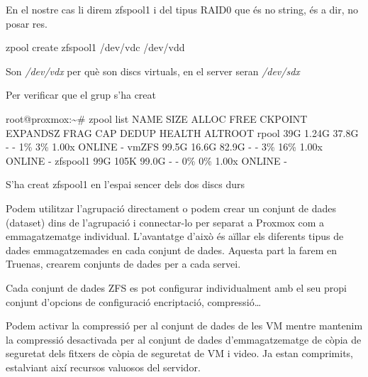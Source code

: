 \documentclass[
  10pt,
]{krantz}
\newenvironment{Shaded}{\begin{snugshade}}{\end{snugshade}}
\newcommand{\AttributeTok}[1]{\textcolor[rgb]{0.77,0.63,0.00}{#1}}
\newcommand{\ExtensionTok}[1]{#1}
\newcommand{\NormalTok}[1]{#1}
\begin{document}
En el nostre cas li direm zfspool1 i del tipus RAID0 que és no string, és a dir, no posar res.

\begin{Shaded}
\begin{Highlighting}[]
\ExtensionTok{zpool}\NormalTok{ create zfspool1 /dev/vdc /dev/vdd}
\end{Highlighting}
\end{Shaded}

\begin{rmdinfo}{}
Son \emph{/dev/vdx} per què son discs virtuals, en el server seran \emph{/dev/sdx}

\end{rmdinfo}

Per verificar que el grup s'ha creat

\begin{Shaded}
\begin{Highlighting}[]
\ExtensionTok{root@proxmox:\textasciitilde{}\#}\NormalTok{ zpool list}
\ExtensionTok{NAME}\NormalTok{       SIZE  ALLOC   FREE  CKPOINT  EXPANDSZ   FRAG    CAP  DEDUP    HEALTH  ALTROOT}
\ExtensionTok{rpool}\NormalTok{       39G  1.24G  37.8G        }\AttributeTok{{-}}         \AttributeTok{{-}}\NormalTok{     1\%     3\%  1.00x    ONLINE  }\AttributeTok{{-}}
\ExtensionTok{vmZFS}\NormalTok{     99.5G  16.6G  82.9G        }\AttributeTok{{-}}         \AttributeTok{{-}}\NormalTok{     3\%    16\%  1.00x    ONLINE  }\AttributeTok{{-}}
\ExtensionTok{zfspool1}\NormalTok{    99G   105K  99.0G        }\AttributeTok{{-}}         \AttributeTok{{-}}\NormalTok{     0\%     0\%  1.00x    ONLINE  }\AttributeTok{{-}}
\end{Highlighting}
\end{Shaded}

S'ha creat zfspool1 en l'espai sencer dels dos discs durs

Podem utilitzar l'agrupació directament o podem crear un conjunt de dades (dataset) dins de l'agrupació i connectar-lo per separat a Proxmox com a emmagatzematge individual. L'avantatge d'això és aïllar els diferents tipus de dades emmagatzemades en cada conjunt de dades. Aquesta part la farem en Truenas, crearem conjunts de dades per a cada servei.

Cada conjunt de dades ZFS es pot configurar individualment amb el seu propi conjunt d'opcions de configuració encriptació, compressió\ldots{}

\begin{rmdinfo}{}
Podem activar la compressió per al conjunt de dades de les VM mentre mantenim la compressió desactivada per al conjunt de dades d'emmagatzematge de còpia de seguretat dels fitxers de còpia de seguretat de VM i video. Ja estan comprimits, estalviant així recursos valuosos del servidor.

\end{rmdinfo}
\end{document}
